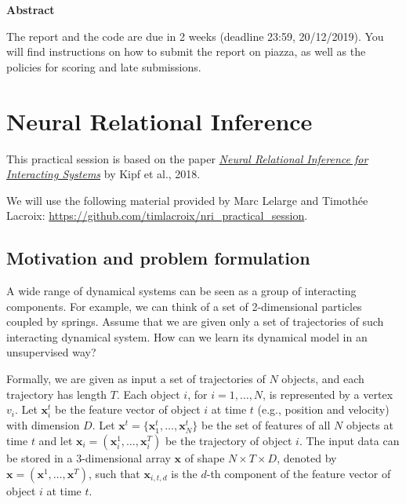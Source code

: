 \documentclass[a4paper, 11pt]{report}
\renewenvironment{abstract}{
\vspace{.5cm}
\begin{center}
\textbf{Abstract} \\
\vspace{.1cm}
}{\end{center}}
\begin{document}

\maketitle

\begin{abstract}
	The report and the code are due in 2 weeks (deadline 23:59, 20/12/2019). You will find instructions on how to submit the report on piazza, as well as the policies for scoring and late submissions.
\end{abstract}

\chapter{Neural Relational Inference}

This practical session is based on the paper \href{https://arxiv.org/pdf/1802.04687.pdf}{\emph{Neural Relational Inference for Interacting Systems}} by Kipf et al., 2018.

We will use the following material provided by Marc Lelarge and Timoth\'ee Lacroix: \url{https://github.com/timlacroix/nri_practical_session}. 

\section{Motivation and problem formulation}
A wide range of dynamical systems can be seen as a group of interacting components. For example, we can think of a set of 2-dimensional particles coupled by springs. Assume that we are given only a set of trajectories of such interacting dynamical system. How can we learn its dynamical model in an unsupervised way?

Formally, we are given as input a set of trajectories of $N$ objects, and each trajectory has length $T$. Each object $i$, for $i=1,\ldots, N$, is represented by a vertex $v_i$. Let $\mathbf{x}_i^t$ be the feature vector of object $i$ at time $t$ (e.g., position and velocity) with dimension $D$. Let $\mathbf{x}^t = \{\mathbf{x}_1^t, \ldots, \mathbf{x}_N^t\}$ be the set of features of all $N$ objects at time $t$ and let $\mathbf{x}_i = (\mathbf{x}_i^1, \ldots, \mathbf{x}_i^T)$ be the trajectory of object $i$. The input data can be stored in a 3-dimensional array $\mathbf{x}$ of shape $N\times T \times D$, denoted by $\mathbf{x} = (\mathbf{x}^1, \ldots, \mathbf{x}^T)$, such that $\mathbf{x}_{i,t,d}$ is the $d$-th component of the feature vector of object $i$ at time $t$. 
\end{document}
